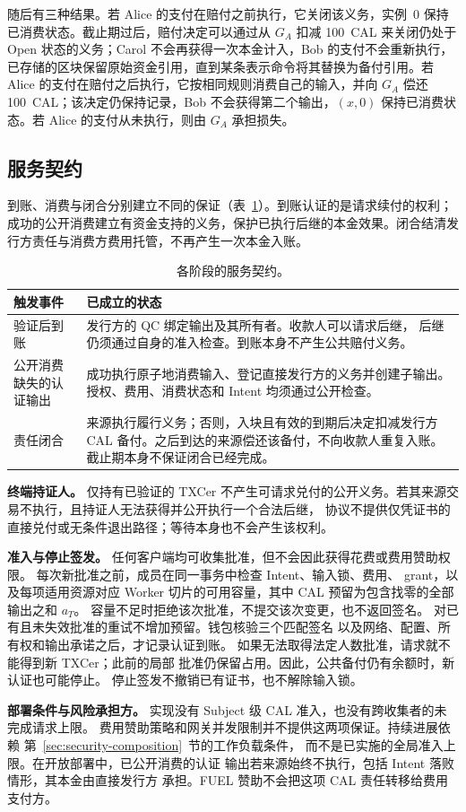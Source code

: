 随后有三种结果。若 Alice 的支付在赔付之前执行，它关闭该义务，实例~0 保持已消费状态。截止期过后，赔付决定可以通过从 $G_A$ 扣减 100~CAL 来关闭仍处于 Open 状态的义务；Carol 不会再获得一次本金计入，Bob 的支付不会重新执行，已存储的区块保留原始资金引用，直到某条表示命令将其替换为备付引用。若 Alice 的支付在赔付之后执行，它按相同规则消费自己的输入，并向 $G_A$ 偿还 100~CAL；该决定仍保持记录，Bob 不会获得第二个输出，$(x,0)$ 保持已消费状态。若 Alice 的支付从未执行，则由 $G_A$ 承担损失。

\subsection{服务契约}
\label{sec:model-contract}
到账、消费与闭合分别建立不同的保证（表~\ref{tab:model-contract}）。到账认证的是请求续付的权利；成功的公开消费建立有资金支持的义务，保护已执行后继的本金效果。闭合结清发行方责任与消费方费用托管，不再产生一次本金入账。

\begin{table}[!t]
\caption{各阶段的服务契约。}
\label{tab:model-contract}
\centering\small
\begin{tabular}{@{}>{\raggedright\arraybackslash}p{}>{\raggedright\arraybackslash}p{}@{}}
\toprule
触发事件 & 已成立的状态 \\
\midrule
验证后到账 &
发行方的 QC 绑定输出及其所有者。收款人可以请求后继，
后继仍须通过自身的准入检查。到账本身不产生公共赔付义务。 \\
公开消费缺失的认证输出 &
成功执行原子地消费输入、登记直接发行方的义务并创建子输出。
授权、费用、消费状态和 Intent 均须通过公开检查。 \\
责任闭合 &
来源执行履行义务；否则，入块且有效的到期后决定扣减发行方
CAL 备付。之后到达的来源偿还该备付，不向收款人重复入账。
截止期本身不保证闭合已经完成。 \\
\bottomrule
\end{tabular}
\end{table}

\noindent\textbf{终端持证人。}
仅持有已验证的 TXCer 不产生可请求兑付的公开义务。若其来源交易不执行，且持证人无法获得并公开执行一个合法后继，
协议不提供仅凭证书的直接兑付或无条件退出路径；等待本身也不会产生该权利。

\noindent\textbf{准入与停止签发。}
任何客户端均可收集批准，但不会因此获得花费或费用赞助权限。
每次新批准之前，成员在同一事务中检查 Intent、输入锁、费用、
grant，以及每项适用资源对应 Worker 切片的可用容量，其中 CAL 预留为包含找零的全部输出之和 $a_T$。
容量不足时拒绝该次批准，不提交该次变更，也不返回签名。
对已有且未失效批准的重试不增加预留。钱包核验三个匹配签名
以及网络、配置、所有权和输出承诺之后，才记录认证到账。
如果无法取得法定人数批准，请求就不能得到新 TXCer；此前的局部
批准仍保留占用。因此，公共备付仍有余额时，新认证也可能停止。
停止签发不撤销已有证书，也不解除输入锁。

\noindent\textbf{部署条件与风险承担方。}
实现没有 Subject 级 CAL 准入，也没有跨收集者的未完成请求上限。
费用赞助策略和网关并发限制并不提供这两项保证。持续进展依赖
第~\ref{sec:security-composition}~节的工作负载条件，
而不是已实施的全局准入上限。在开放部署中，已公开消费的认证
输出若来源始终不执行，包括 Intent 落败情形，其本金由直接发行方
承担。FUEL 赞助不会把这项 CAL 责任转移给费用支付方。
